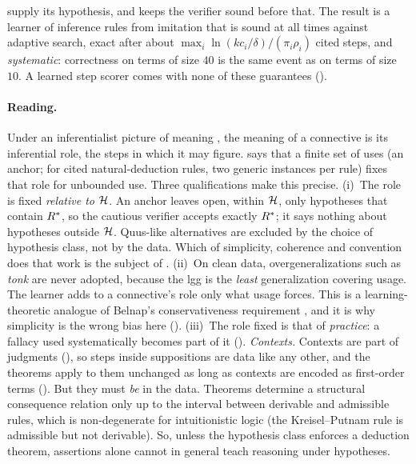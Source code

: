  supply its hypothesis, and  keeps the verifier sound before that. The result is a learner of inference rules from imitation that is sound at all times against adaptive search, exact after about $\max_i\ln(kc_i/\delta)/(\pi_i\rho_i)$ cited steps, and \emph{systematic}: correctness on terms of size $40$ is the same event as on terms of size $10$. A learned step scorer comes with none of these guarantees ().

\paragraph{Reading.} Under an inferentialist picture of meaning \citep{brandom1994making}, the meaning of a connective is its inferential role, the steps in which it may figure.  says that a finite set of uses (an anchor; for cited natural-deduction rules, two generic instances per rule) fixes that role for unbounded use. Three qualifications make this precise.
(i)~The role is fixed \emph{relative to $\mathcal{H}$}. An anchor leaves open, within $\mathcal{H}$, only hypotheses that contain $R^{*}$, so the cautious verifier accepts exactly $R^{*}$; it says nothing about hypotheses outside $\mathcal{H}$. Quus-like alternatives \citep{kripke1982wittgenstein} are excluded by the choice of hypothesis class, not by the data. Which of simplicity, coherence and convention does that work is the subject of .
(ii)~On clean data, overgeneralizations such as \emph{tonk} are never adopted, because the lgg is the \emph{least} generalization covering usage. The learner adds to a connective's role only what usage forces. This is a learning-theoretic analogue of Belnap's conservativeness requirement \citep{belnap1962tonk}, and it is why simplicity is the wrong bias here ().
(iii)~The role fixed is that of \emph{practice}: a fallacy used systematically becomes part of it ().
\emph{Contexts.} Contexts are part of judgments (), so steps inside suppositions are data like any other, and the theorems apply to them unchanged as long as contexts are encoded as first-order terms (). But they must \emph{be} in the data. Theorems determine a structural consequence relation only up to the interval between derivable and admissible rules, which is non-degenerate for intuitionistic logic (the Kreisel--Putnam rule is admissible but not derivable). So, unless the hypothesis class enforces a deduction theorem, assertions alone cannot in general teach reasoning under hypotheses.

